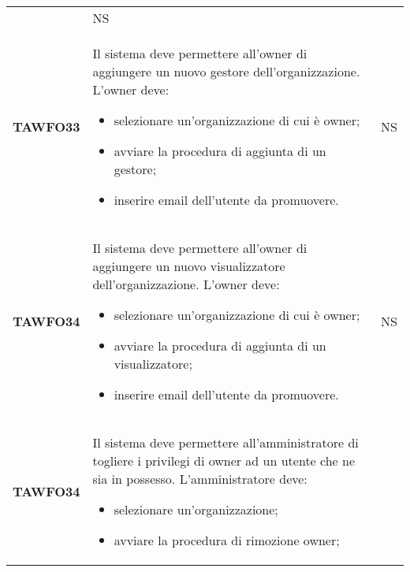 \documentclass[../piano-di-qualifica.tex]{subfiles}
\begin{document}
\begin{longtable}[H]{>{\centering\bfseries}m{3cm} >{}m{11cm} >{\centering\arraybackslash}m{2cm}}
\begin{itemize}
  \end{itemize}
                                  & NS                                                                                                                                                                                                                                   \\
  TAWFO33                         & Il sistema deve permettere all’owner di aggiungere un nuovo gestore dell’organizzazione.    \newline
  L'owner deve:
  \begin{itemize}
    \item selezionare un'organizzazione di cui è owner;
    \item avviare la procedura di aggiunta di un gestore;
    \item inserire email dell'utente da promuovere.
  \end{itemize}
                                  & NS                                                                                                                                                                                                                                   \\
  TAWFO34                         & Il sistema deve permettere all’owner di aggiungere un nuovo visualizzatore dell’organizzazione.    \newline
  L'owner deve:
  \begin{itemize}
    \item selezionare un'organizzazione di cui è owner;
    \item avviare la procedura di aggiunta di un visualizzatore;
    \item inserire email dell'utente da promuovere.
  \end{itemize}
                                  & NS                                                                                                                                                                                                                                   \\
  TAWFO34                         & Il sistema deve permettere all’amministratore di togliere i privilegi di owner ad un utente che ne sia in possesso.    \newline
  L'amministratore deve:
  \begin{itemize}
    \item selezionare un'organizzazione;
    \item avviare la procedura di rimozione owner;

\end{itemize}
\end{longtable}
\end{document}
